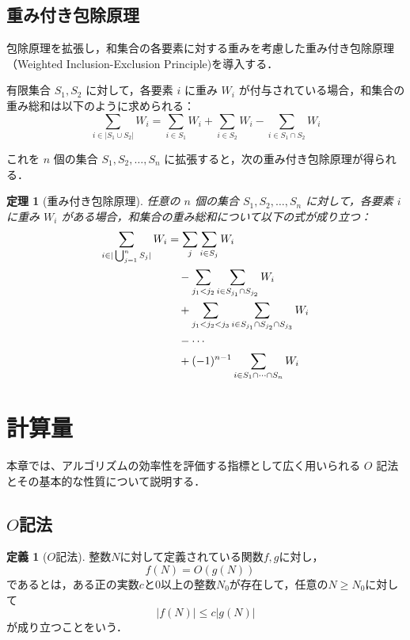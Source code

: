 \documentclass[11pt]{jsreport}
\theoremstyle{plain} %
\newtheorem{theorem}{定理}
\theoremstyle{definition}
\newtheorem{definition}{定義}
\begin{document}
\subsection{重み付き包除原理}

包除原理を拡張し，和集合の各要素に対する重みを考慮した重み付き包除原理（Weighted Inclusion-Exclusion Principle)を導入する．

有限集合 $S_1, S_2$ に対して，各要素 $i$ に重み $W_i$ が付与されている場合，和集合の重み総和は以下のように求められる：
\begin{equation}
    \sum_{i \in |S_1 \cup S_2|} W_i = \sum_{i \in S_1} W_i + \sum_{i \in S_2} W_i - \sum_{i \in S_1 \cap S_2} W_i
\end{equation}

これを $n$ 個の集合 $S_1, S_2, \dots, S_n$ に拡張すると，次の重み付き包除原理が得られる．
\begin{theorem}[重み付き包除原理]
    任意の $n$ 個の集合 $S_1, S_2, \dots, S_n$ に対して，各要素 $i$ に重み $W_i$ がある場合，和集合の重み総和について以下の式が成り立つ：
    \begin{align}
    \sum_{i \in |\bigcup_{j=1}^{n} S_j|} W_i \notag
    &= \sum_{j} \sum_{i \in S_j} W_i \notag \\
    &\quad - \sum_{j_1 < j_2} \sum_{i \in S_{j_1} \cap S_{j_2}} W_i \notag \\
    &\quad + \sum_{j_1 < j_2 < j_3} \sum_{i \in S_{j_1} \cap S_{j_2} \cap S_{j_3}} W_i \notag \\
    &\quad - \cdots \notag \\
    &\quad + (-1)^{n-1} \sum_{i \in S_1 \cap \cdots \cap S_n} W_i
    \end{align}
\end{theorem}
\section{計算量}

本章では、アルゴリズムの効率性を評価する指標として広く用いられる $O$ 記法とその基本的な性質について説明する．

\subsection{$O$記法}

\begin{definition}[$O$記法]
    整数$N$に対して定義されている関数$f, g$に対し，
    \[
    f(N) = O(g(N)) \quad
    \]
    であるとは，ある正の実数$c$と0以上の整数$N_0$が存在して，任意の$N \geq N_0$に対して
    \[
    |f(N)| \leq c|g(N)|
    \]
    が成り立つことをいう．
\end{definition}
\end{document}
